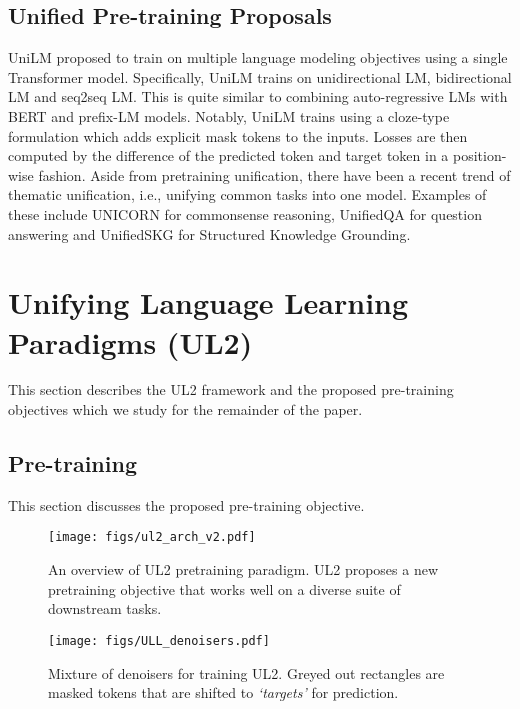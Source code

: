 \documentclass[10pt]{article}
\begin{document}
\subsection{Unified Pre-training Proposals}
UniLM \citep{dong2019unified} proposed to train on multiple language modeling objectives using a single Transformer model. Specifically, UniLM trains on unidirectional LM, bidirectional LM and seq2seq LM. This is quite similar to combining auto-regressive LMs with BERT and prefix-LM models. Notably, UniLM trains using a cloze-type formulation which adds explicit mask tokens to the inputs. Losses are then computed by the difference of the predicted token and target token in a position-wise fashion. Aside from pretraining unification, there have been a recent trend of thematic unification, i.e., unifying common tasks into one model. Examples of these include UNICORN \citep{lourie2021unicorn} for commonsense reasoning, UnifiedQA \citep{khashabi2020unifiedqa,khashabi2022unifiedqa} for question answering and UnifiedSKG \citep{xie2022unifiedskg} for Structured Knowledge Grounding.








 
\section{Unifying Language Learning Paradigms (UL2)}
This section describes the UL2 framework and the proposed pre-training objectives which we study for the remainder of the paper.







\subsection{Pre-training}
This section discusses the proposed pre-training objective. 









\begin{figure*}[t!]
    \centering
    \texttt{[image: figs/ul2\_arch\_v2.pdf]}
        \vspace{-1em}
    \label{fig:ul2_overview}
\caption{An overview of UL2 pretraining paradigm. UL2 proposes a new pretraining objective that works well on a diverse suite of downstream tasks.}
\label{stats}
\end{figure*}
\begin{figure*}[t!]
    \centering
    \texttt{[image: figs/ULL\_denoisers.pdf]}
        \vspace{-1em}
    \label{fig:transformer_arch}
\caption{Mixture of denoisers for training UL2. Greyed out rectangles are masked tokens that are shifted to \textit{`targets'} for prediction.}
\label{stats}
\end{figure*}
\end{document}
